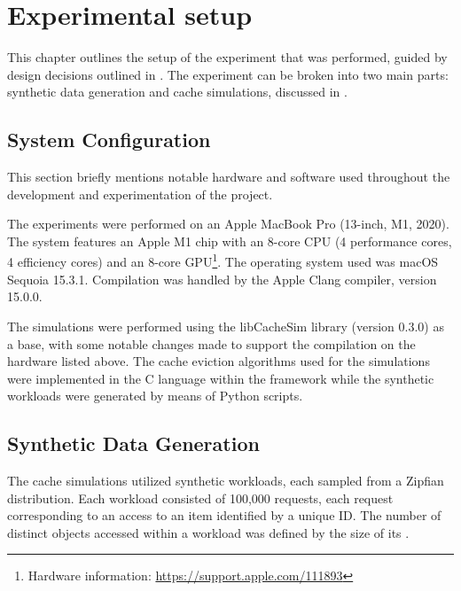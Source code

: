 \chapter{Experimental setup}\label{chapter:experimental-setup}

This chapter outlines the setup of the experiment that was performed, guided by design decisions outlined in . The experiment can be broken into two main parts: synthetic data generation and cache simulations, discussed in .


\section{System Configuration}

This section briefly mentions notable hardware and software used throughout the development and experimentation of the project.

\begin{description}[style=unboxed, leftmargin=0cm]
    \item[Hardware] The experiments were performed on an Apple MacBook Pro (13-inch, M1, 2020). The system features an Apple M1 chip with an 8-core CPU (4 performance cores, 4 efficiency cores) and an 8-core GPU\footnote{Hardware information: \url{https://support.apple.com/111893}}. The operating system used was macOS Sequoia 15.3.1. Compilation was handled by the Apple Clang compiler, version 15.0.0.
    \item[Software] The simulations were performed using the libCacheSim library (version 0.3.0) as a base, with some notable changes made to support the compilation on the hardware listed above. The cache eviction algorithms used for the simulations were implemented in the C language within the framework while the synthetic workloads were generated by means of Python scripts.
\end{description}


\section{Synthetic Data Generation}\label{subsec: synthetic-data-generation}

The cache simulations utilized synthetic workloads, each sampled from a Zipfian distribution. Each workload consisted of 100,000 requests, each request corresponding to an access to an item identified by a unique ID. The number of distinct objects accessed within a workload was defined by the size of its . 

